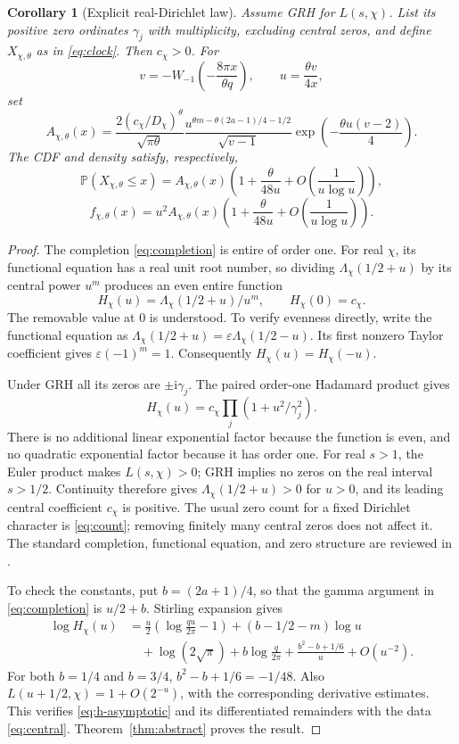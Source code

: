 \documentclass[11pt]{article}
\newtheorem{corollary}[theorem]{Corollary}
\theoremstyle{remark}\newtheorem{remark}[theorem]{Remark}
\newcommand{\Prob}{\mathbb P}
\newcommand{\ii}{\mathrm i}
\newcommand{\asymerror}{O\!\left(\frac1{u\log u}\right)}
\begin{document}
\begin{corollary}[Explicit real-Dirichlet law]\label{cor:Dirichlet}
Assume GRH for $L(s,\chi)$. List its positive zero ordinates $\gamma_j$
with multiplicity, excluding central zeros, and define $X_{\chi,\theta}$
as in \eqref{eq:clock}. Then $c_\chi>0$. For
\[
 v=-W_{-1}\!\left(-\frac{8\pi x}{\theta q}\right),\qquad
 u=\frac{\theta v}{4x},
\]
set
\begin{equation}\label{eq:Dirichlet-A}
 A_{\chi,\theta}(x)=
 \frac{2(c_\chi/D_\chi)^\theta}{\sqrt{\pi\theta}}
 \frac{u^{\theta m-\theta(2a-1)/4-1/2}}{\sqrt{v-1}}
 \exp\!\left(-\frac{\theta u(v-2)}4\right).
\end{equation}
The CDF and density satisfy, respectively,
\[
 \Prob(X_{\chi,\theta}\leq x)
 =A_{\chi,\theta}(x)
     \left(1+\frac{\theta}{48u}+\asymerror\right),
\]
\[
 f_{\chi,\theta}(x)
 =u^2A_{\chi,\theta}(x)
     \left(1+\frac{\theta}{48u}+\asymerror\right).
\]
\end{corollary}

\begin{proof}
The completion \eqref{eq:completion} is entire of order one. For real
$\chi$, its functional equation has a real unit root number, so dividing
$\Lambda_\chi(1/2+u)$ by its central power $u^m$ produces an even entire
function
\[
 H_\chi(u)=\Lambda_\chi(1/2+u)/u^m,
 \qquad H_\chi(0)=c_\chi.
\]
The removable value at $0$ is understood. To verify evenness directly,
write the functional equation as
$\Lambda_\chi(1/2+u)=\varepsilon\Lambda_\chi(1/2-u)$.
Its first nonzero Taylor coefficient gives $\varepsilon(-1)^m=1$.
Consequently $H_\chi(u)=H_\chi(-u)$.

Under GRH all its zeros are $\pm\ii\gamma_j$. The paired order-one
Hadamard product gives
\[
 H_\chi(u)=c_\chi\prod_j(1+u^2/\gamma_j^2).
\]
There is no additional linear exponential factor because the function is
even, and no quadratic exponential factor because it has order one.
For real $s>1$, the Euler product makes $L(s,\chi)>0$; GRH implies no
zeros on the real interval $s>1/2$. Continuity therefore gives
$\Lambda_\chi(1/2+u)>0$ for $u>0$, and its leading central coefficient
$c_\chi$ is positive. The usual zero count for a fixed Dirichlet character
is \eqref{eq:count}; removing finitely many central zeros does not affect
it. The standard completion, functional equation, and zero structure are
reviewed in \cite{dlmf-dirichlet,davenport}.

To check the constants, put $b=(2a+1)/4$, so that the gamma argument in
\eqref{eq:completion} is $u/2+b$. Stirling expansion gives
\begin{align*}
 \log H_\chi(u)
 &=\frac u2\left(\log\frac{qu}{2\pi}-1\right)
   +(b-1/2-m)\log u\\
 &\quad+\log(2\sqrt\pi)+b\log\frac q{2\pi}
   +\frac{b^2-b+1/6}{u}+O(u^{-2}).
\end{align*}
For both $b=1/4$ and $b=3/4$,
$b^2-b+1/6=-1/48$. Also $L(u+1/2,\chi)=1+O(2^{-u})$,
with the corresponding derivative estimates. This verifies
\eqref{eq:h-asymptotic} and its differentiated remainders with the data
\eqref{eq:central}. Theorem~\ref{thm:abstract} proves the result.
\end{proof}
\end{document}
